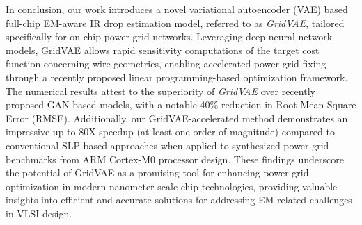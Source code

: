 \documentclass[journal]{IEEEtran}
\begin{document}
In conclusion, our work introduces a novel variational autoencoder
(VAE) based full-chip EM-aware IR drop estimation model, referred to
as {\it GridVAE},  tailored specifically for on-chip power grid
networks. Leveraging deep neural network models, GridVAE allows rapid
sensitivity computations of the target cost function concerning wire
geometries, enabling accelerated power grid fixing through a recently
proposed linear programming-based optimization framework. The
numerical results attest to the superiority of {\it GridVAE} over recently
proposed GAN-based models, with a notable 40\% reduction in Root Mean
Square Error (RMSE). Additionally, our GridVAE-accelerated method
demonstrates an impressive up to 80X speedup (at least one order of
magnitude) compared to conventional SLP-based approaches when applied
to synthesized power grid benchmarks from ARM Cortex-M0 processor
design. These findings underscore the potential of GridVAE as a
promising tool for enhancing power grid optimization in modern
nanometer-scale chip technologies, providing valuable insights into
efficient and accurate solutions for addressing EM-related challenges
in VLSI design.



%
%
\end{document}
